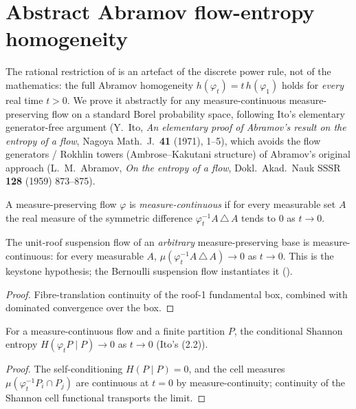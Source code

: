 \section{Abstract Abramov flow-entropy homogeneity}

The rational restriction of  is an artefact of the discrete power
rule, not of the mathematics: the full Abramov homogeneity $h(\varphi_t) = t\,h(\varphi_1)$ holds
for \emph{every} real time $t > 0$. We prove it abstractly for any measure-continuous
measure-preserving flow on a standard Borel probability space, following Ito's elementary
generator-free argument (Y.~Ito, \emph{An elementary proof of Abramov's result on the entropy of a
flow}, Nagoya Math.\ J.\ \textbf{41} (1971), 1--5), which avoids the flow generators / Rokhlin
towers (Ambrose--Kakutani structure) of Abramov's original approach (L.~M.~Abramov, \emph{On the
entropy of a flow}, Dokl.\ Akad.\ Nauk SSSR \textbf{128} (1959) 873--875).

\begin{definition}\label{def:flow-measCont}
  \leanok
  A measure-preserving flow $\varphi$ is \emph{measure-continuous} if for every measurable set $A$
  the real measure of the symmetric difference $\varphi_t^{-1} A \,\triangle\, A$ tends to $0$ as
  $t \to 0$.
\end{definition}

\begin{theorem}\label{thm:flow-suspMeasCont}
  \leanok
  The unit-roof suspension flow of an \emph{arbitrary} measure-preserving base is measure-continuous:
  for every measurable $A$, $\mu\!\left(\varphi_t^{-1} A \,\triangle\, A\right) \to 0$ as $t \to 0$.
  This is the keystone hypothesis; the Bernoulli suspension flow instantiates it
  ().
\end{theorem}
\begin{proof}\leanok
  Fibre-translation continuity of the roof-1 fundamental box, combined with dominated convergence
  over the box.
\end{proof}

\begin{theorem}\label{thm:flow-L1}
  \leanok
  For a measure-continuous flow and a finite partition $P$, the conditional Shannon entropy
  $H(\varphi_t P \mid P) \to 0$ as $t \to 0$ (Ito's (2.2)).
\end{theorem}
\begin{proof}\leanok
  The self-conditioning $H(P \mid P) = 0$, and the cell measures $\mu(\varphi_t^{-1}P_i \cap P_j)$
  are continuous at $t = 0$ by measure-continuity; continuity of the Shannon cell functional
  transports the limit.
\end{proof}

